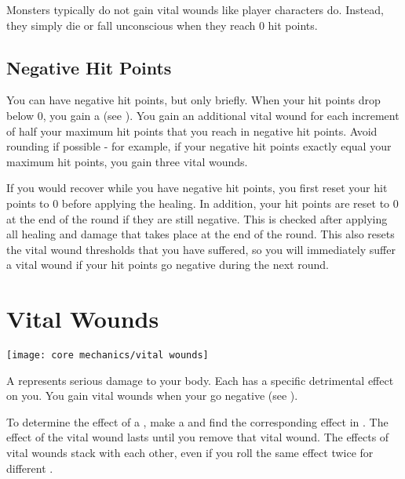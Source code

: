     Monsters typically do not gain vital wounds like player characters do.
    Instead, they simply die or fall unconscious when they reach 0 hit points.

    \subsection{Negative Hit Points}\label{Negative Hit Points}
        You can have negative hit points, but only briefly.
        When your hit points drop below 0, you gain a  (see ).
        You gain an additional vital wound for each increment of half your maximum hit points that you reach in negative hit points.
        Avoid rounding if possible - for example, if your negative hit points exactly equal your maximum hit points, you gain three vital wounds.

        If you would recover  while you have negative hit points, you first reset your hit points to 0 before applying the healing.
        In addition, your hit points are reset to 0 at the end of the round if they are still negative.
        This is checked after applying all healing and damage that takes place at the end of the round.
        This also resets the vital wound thresholds that you have suffered, so you will immediately suffer a vital wound if your hit points go negative during the next round.

\section{Vital Wounds}\label{Vital Wounds}
    \texttt{[image: core mechanics/vital wounds]}

    A  represents serious damage to your body.
    Each  has a specific detrimental effect on you.
    You gain vital wounds when your  go negative (see ).

    To determine the effect of a , make a  and find the corresponding effect in .
    The effect of the vital wound lasts until you remove that vital wound.
    The effects of vital wounds stack with each other, even if you roll the same effect twice for different .

